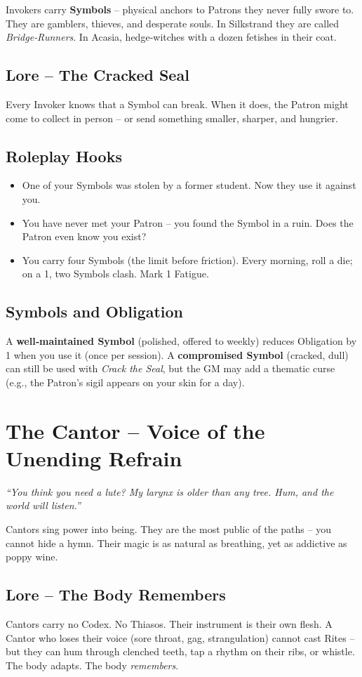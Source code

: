 \documentclass[10pt,a5paper]{book}
\begin{document}
Invokers carry \textbf{Symbols} – physical anchors to Patrons they never fully swore to. They are gamblers, thieves, and desperate souls. In Silkstrand they are called \textit{Bridge‑Runners}. In Acasia, hedge‑witches with a dozen fetishes in their coat.

\subsection{Lore – The Cracked Seal}
Every Invoker knows that a Symbol can break. When it does, the Patron might come to collect in person – or send something smaller, sharper, and hungrier.

\subsection{Roleplay Hooks}
\begin{itemize}
    \item One of your Symbols was stolen by a former student. Now they use it against you.
    \item You have never met your Patron – you found the Symbol in a ruin. Does the Patron even know you exist?
    \item You carry four Symbols (the limit before friction). Every morning, roll a die; on a 1, two Symbols clash. Mark 1 Fatigue.
\end{itemize}

\subsection{Symbols and Obligation}
A \textbf{well‑maintained Symbol} (polished, offered to weekly) reduces Obligation by 1 when you use it (once per session). A \textbf{compromised Symbol} (cracked, dull) can still be used with \textit{Crack the Seal}, but the GM may add a thematic curse (e.g., the Patron’s sigil appears on your skin for a day).

\section{The Cantor – Voice of the Unending Refrain}
\textit{“You think you need a lute? My larynx is older than any tree. Hum, and the world will listen.”}

Cantors sing power into being. They are the most public of the paths – you cannot hide a hymn. Their magic is as natural as breathing, yet as addictive as poppy wine.

\subsection{Lore – The Body Remembers}
Cantors carry no Codex. No Thiasos. Their instrument is their own flesh. A Cantor who loses their voice (sore throat, gag, strangulation) cannot cast Rites – but they can hum through clenched teeth, tap a rhythm on their ribs, or whistle. The body adapts. The body \textit{remembers}.
\end{document}
